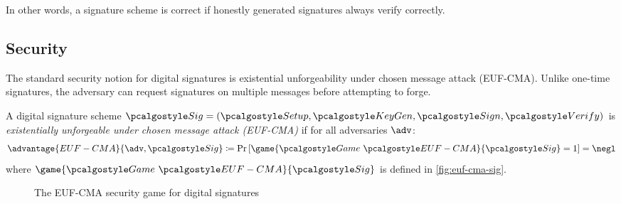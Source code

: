 In other words, a signature scheme is correct if honestly generated signatures always verify correctly.

\subsection{Security}

The standard security notion for digital signatures is existential unforgeability under chosen message attack (EUF-CMA). Unlike one-time signatures, the adversary can request signatures on multiple messages before attempting to forge.

\begin{definition}\label{def:euf-cma}
  A digital signature scheme $\algo{Sig} = (\algo{Setup}, \algo{KeyGen}, \algo{Sign}, \algo{Verify})$ is \emph{existentially unforgeable under chosen message attack (EUF-CMA)} if for all \ppt adversaries $\adv$:
  \[
    \advantage{EUF-CMA}{\adv, \algo{Sig}} \defeq \pr{\game{\Game~\algo{EUF-CMA}}{\algo{Sig}} = 1} = \negl
  \]
  where $\game{\Game~\algo{EUF-CMA}}{\algo{Sig}}$ is defined in \autoref{fig:euf-cma-sig}.
\end{definition}

\begin{figure}[tbh]
  \begin{tcolorbox}
    \begin{pchstack}[center]
      \pchspace
    \end{pchstack}
  \end{tcolorbox}
  \caption{The EUF-CMA security game for digital signatures}
  \label{fig:euf-cma-sig}
\end{figure}


